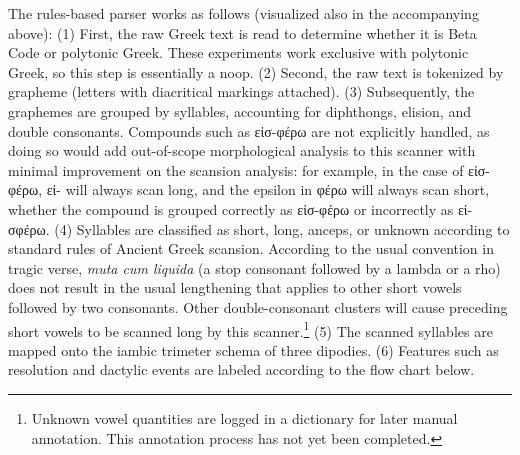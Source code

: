 \documentclass[
]{ceurart}
\begin{document}
The rules-based parser works as follows (visualized also in the accompanying
above): (1) First, the raw Greek text is read to determine whether it is Beta
Code or polytonic Greek. These experiments work exclusive with polytonic
Greek, so this step is essentially a noop. (2) Second, the raw text is
tokenized by grapheme (letters with diacritical markings attached).
(3) Subsequently, the graphemes are grouped by syllables, accounting for
diphthongs, elision, and double consonants. Compounds such as εἰσ-φέρω are
not explicitly handled, as doing so would add out-of-scope morphological
analysis to this scanner with minimal improvement on the scansion analysis:
for example, in the case of εἰσ-φέρω, εἰ- will always scan long, and the
epsilon in φέρω will always scan short, whether the compound is grouped
correctly as εἰσ-φέρω or incorrectly as εἰ-σφέρω. (4) Syllables are
classified as short, long, anceps, or unknown according to standard rules of
Ancient Greek scansion. According to the usual convention in tragic
verse, \textit{muta cum liquida} (a stop consonant followed by a lambda or a
rho) does not result in the usual lengthening that applies to other short
vowels followed by two consonants. Other double-consonant clusters will cause
preceding short vowels to be scanned long by this scanner.\footnote
{Unknown vowel quantities are logged in a dictionary for later manual
annotation. This annotation process has not yet been completed.} (5) The
scanned syllables are mapped onto the iambic trimeter schema of three
dipodies. (6) Features such as resolution and dactylic events are labeled
according to the flow chart below.

\noindent
\begin{minipage}{\linewidth}
\end{minipage}
\end{document}
